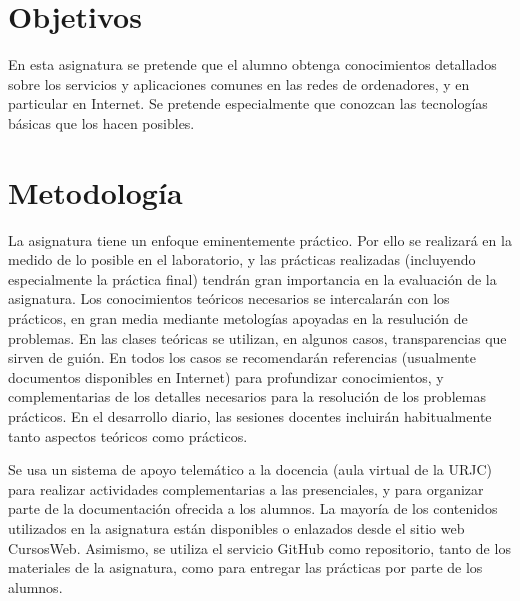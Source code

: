 \documentclass[a4paper,12pt]{article}
\begin{document}
\newpage

\section{Objetivos}

En esta asignatura se pretende que el alumno obtenga conocimientos detallados sobre los servicios y aplicaciones comunes en las redes de ordenadores, y en particular en Internet. Se pretende especialmente que conozcan las tecnologías básicas que los hacen posibles.

\section{Metodología}

La asignatura tiene un enfoque eminentemente práctico. Por ello se realizará en la medido de lo posible en el laboratorio, y las prácticas realizadas (incluyendo especialmente la práctica final) tendrán gran importancia en la evaluación de la asignatura. Los conocimientos teóricos necesarios se intercalarán con los prácticos, en gran media mediante metologías apoyadas en la resulución de problemas. En las clases teóricas se utilizan, en algunos casos, transparencias que sirven de guión. En todos los casos se recomendarán referencias (usualmente documentos disponibles en Internet) para profundizar conocimientos, y complementarias de los detalles necesarios para la resolución de los problemas prácticos. En el desarrollo diario, las sesiones docentes incluirán habitualmente tanto aspectos teóricos como prácticos.

Se usa un sistema de apoyo telemático a la docencia (aula virtual de la URJC) para realizar actividades complementarias a las presenciales, y para organizar parte de la documentación ofrecida a los alumnos. La mayoría de los contenidos utilizados en la asignatura están disponibles o enlazados desde el sitio web CursosWeb. Asimismo, se utiliza el servicio GitHub como repositorio, tanto de los materiales de la asignatura, como para entregar las prácticas por parte de los alumnos.

\newpage

\end{document}

